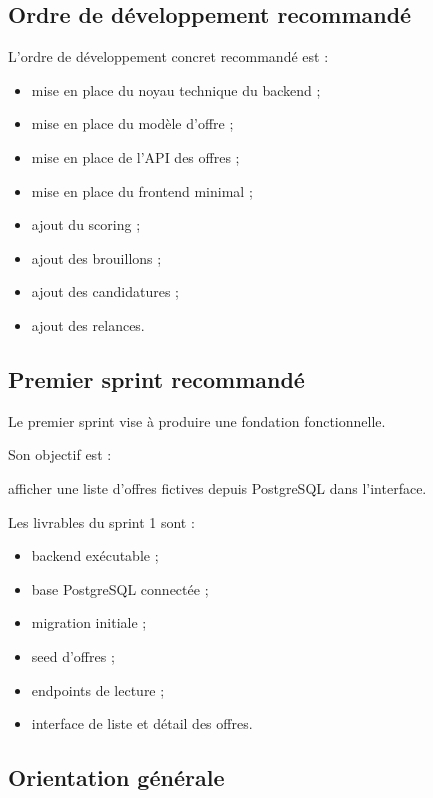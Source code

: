 \documentclass[11pt,a4paper]{article}
\begin{document}
\subsection{Ordre de développement recommandé}

L’ordre de développement concret recommandé est :

\begin{itemize}
    \item mise en place du noyau technique du backend ;
    \item mise en place du modèle d’offre ;
    \item mise en place de l’API des offres ;
    \item mise en place du frontend minimal ;
    \item ajout du scoring ;
    \item ajout des brouillons ;
    \item ajout des candidatures ;
    \item ajout des relances.
\end{itemize}

\subsection{Premier sprint recommandé}

Le premier sprint vise à produire une fondation fonctionnelle.

Son objectif est :

\begin{center}
afficher une liste d’offres fictives depuis PostgreSQL dans l’interface.
\end{center}

Les livrables du sprint 1 sont :

\begin{itemize}
    \item backend exécutable ;
    \item base PostgreSQL connectée ;
    \item migration initiale ;
    \item seed d’offres ;
    \item endpoints de lecture ;
    \item interface de liste et détail des offres.
\end{itemize}

\subsection{Orientation générale}
\end{document}
